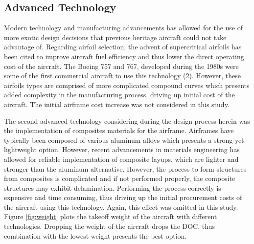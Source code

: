 \documentclass{article}
\begin{document}
    \subsection{Advanced Technology}
    \label{sec:adv_tech}
        \begin{flushleft}
            Modern technology and manufacturing advancements has allowed for the
            use of more exotic design decisions that previous heritage aircraft
            could not take advantage of. Regarding airfoil selection, the advent
            of supercritical airfoils has been cited to improve aircraft fuel
            efficiency and thus lower the direct operating cost of the aircraft.
            The Boeing 757 and 767, developed during the 1980s were some of the
            first commercial aircraft to use this technology (2). However, these
            airfoils types are comprised of more complicated compound curves
            which presents added complexity in the manufacturing process,
            driving up initial cost of the aircraft. The initial airframe cost
            increase was not considered in this study.

            The second advanced technology considering during the design process
            herein was the implementation of composites materials for the
            airframe. Airframes have typically been composed of various aluminum
            alloys which presents a strong yet lightweight option. However,
            recent advancements in materials engineering has allowed for
            reliable implementation of composite layups, which are lighter and
            stronger than the aluminum alternative. However, the process to form
            structures from composites is complicated and if not performed
            properly, the composite structures may exhibit delamination.
            Performing the process correctly is expensive and time consuming,
            thus driving up the initial procurement costs of the aircraft using
            this technology. Again, this effect was omitted in this study.
            Figure \ref{fig:weight} plots the takeoff weight of the aircraft
            with different technologies. Dropping the weight of the aircraft
            drops the DOC, thus combination with the lowest weight presents the
            best option.
        \end{flushleft}

\end{document}
